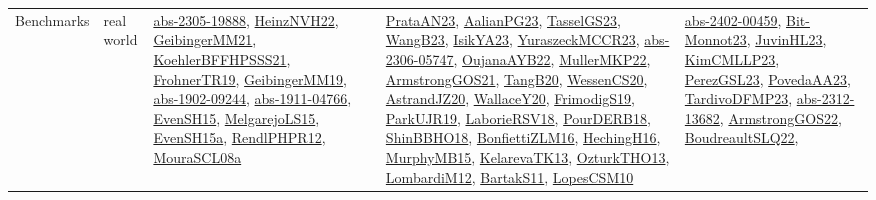 {\begin{longtable}{lp{3cm}>{\raggedright}p{6cm}>{\raggedright}p{6cm}p{8cm}}
Benchmarks & real world & \href{articles/abs-2305-19888.pdf}{abs-2305-19888}\cite{abs-2305-19888}, \href{articles/HeinzNVH22.pdf}{HeinzNVH22}\cite{HeinzNVH22}, \href{papers/GeibingerMM21.pdf}{GeibingerMM21}\cite{GeibingerMM21}, \href{articles/KoehlerBFFHPSSS21.pdf}{KoehlerBFFHPSSS21}\cite{KoehlerBFFHPSSS21}, \href{papers/FrohnerTR19.pdf}{FrohnerTR19}\cite{FrohnerTR19}, \href{papers/GeibingerMM19.pdf}{GeibingerMM19}\cite{GeibingerMM19}, \href{articles/abs-1902-09244.pdf}{abs-1902-09244}\cite{abs-1902-09244}, \href{articles/abs-1911-04766.pdf}{abs-1911-04766}\cite{abs-1911-04766}, \href{papers/EvenSH15.pdf}{EvenSH15}\cite{EvenSH15}, \href{papers/MelgarejoLS15.pdf}{MelgarejoLS15}\cite{MelgarejoLS15}, \href{articles/EvenSH15a.pdf}{EvenSH15a}\cite{EvenSH15a}, \href{papers/RendlPHPR12.pdf}{RendlPHPR12}\cite{RendlPHPR12}, \href{papers/MouraSCL08a.pdf}{MouraSCL08a}\cite{MouraSCL08a} & \href{articles/PrataAN23.pdf}{PrataAN23}\cite{PrataAN23}, \href{papers/AalianPG23.pdf}{AalianPG23}\cite{AalianPG23}, \href{papers/TasselGS23.pdf}{TasselGS23}\cite{TasselGS23}, \href{papers/WangB23.pdf}{WangB23}\cite{WangB23}, \href{articles/IsikYA23.pdf}{IsikYA23}\cite{IsikYA23}, \href{articles/YuraszeckMCCR23.pdf}{YuraszeckMCCR23}\cite{YuraszeckMCCR23}, \href{articles/abs-2306-05747.pdf}{abs-2306-05747}\cite{abs-2306-05747}, \href{papers/OujanaAYB22.pdf}{OujanaAYB22}\cite{OujanaAYB22}, \href{articles/MullerMKP22.pdf}{MullerMKP22}\cite{MullerMKP22}, \href{papers/ArmstrongGOS21.pdf}{ArmstrongGOS21}\cite{ArmstrongGOS21}, \href{papers/TangB20.pdf}{TangB20}\cite{TangB20}, \href{papers/WessenCS20.pdf}{WessenCS20}\cite{WessenCS20}, \href{articles/AstrandJZ20.pdf}{AstrandJZ20}\cite{AstrandJZ20}, \href{articles/WallaceY20.pdf}{WallaceY20}\cite{WallaceY20}, \href{papers/FrimodigS19.pdf}{FrimodigS19}\cite{FrimodigS19}, \href{papers/ParkUJR19.pdf}{ParkUJR19}\cite{ParkUJR19}, \href{articles/LaborieRSV18.pdf}{LaborieRSV18}\cite{LaborieRSV18}, \href{articles/PourDERB18.pdf}{PourDERB18}\cite{PourDERB18}, \href{articles/ShinBBHO18.pdf}{ShinBBHO18}\cite{ShinBBHO18}, \href{papers/BonfiettiZLM16.pdf}{BonfiettiZLM16}\cite{BonfiettiZLM16}, \href{papers/HechingH16.pdf}{HechingH16}\cite{HechingH16}, \href{papers/MurphyMB15.pdf}{MurphyMB15}\cite{MurphyMB15}, \href{papers/KelarevaTK13.pdf}{KelarevaTK13}\cite{KelarevaTK13}, \href{articles/OzturkTHO13.pdf}{OzturkTHO13}\cite{OzturkTHO13}, \href{articles/LombardiM12.pdf}{LombardiM12}\cite{LombardiM12}, \href{articles/BartakS11.pdf}{BartakS11}\cite{BartakS11}, \href{articles/LopesCSM10.pdf}{LopesCSM10}\cite{LopesCSM10} & \href{articles/abs-2402-00459.pdf}{abs-2402-00459}\cite{abs-2402-00459}, \href{papers/Bit-Monnot23.pdf}{Bit-Monnot23}\cite{Bit-Monnot23}, \href{papers/JuvinHL23.pdf}{JuvinHL23}\cite{JuvinHL23}, \href{papers/KimCMLLP23.pdf}{KimCMLLP23}\cite{KimCMLLP23}, \href{papers/PerezGSL23.pdf}{PerezGSL23}\cite{PerezGSL23}, \href{papers/PovedaAA23.pdf}{PovedaAA23}\cite{PovedaAA23}, \href{papers/TardivoDFMP23.pdf}{TardivoDFMP23}\cite{TardivoDFMP23}, \href{articles/abs-2312-13682.pdf}{abs-2312-13682}\cite{abs-2312-13682}, \href{papers/ArmstrongGOS22.pdf}{ArmstrongGOS22}\cite{ArmstrongGOS22}, \href{papers/BoudreaultSLQ22.pdf}{BoudreaultSLQ22}\cite{BoudreaultSLQ22}, 
\end{longtable}}
